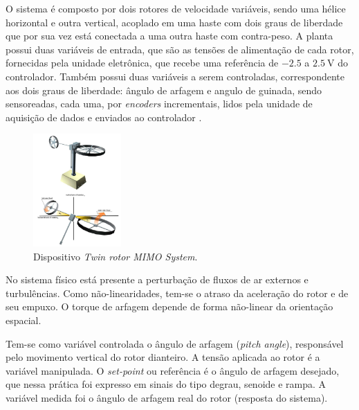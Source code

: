 O sistema é composto por dois rotores de velocidade variáveis, sendo uma hélice horizontal e outra vertical, acoplado em uma haste com dois graus de liberdade que por sua vez está conectada a uma outra haste com contra-peso.
A planta possui duas variáveis de entrada, que são as tensões de alimentação de cada rotor, fornecidas pela unidade eletrônica, que recebe uma referência de $-2.5$ a $\SI{2.5}{\volt}$ do controlador. Também possui duas variáveis a serem controladas, correspondente aos dois graus de liberdade: ângulo de arfagem e angulo de guinada, sendo sensoreadas, cada uma, por \textit{encoders} incrementais, lidos pela unidade de aquisição de dados e enviados ao controlador \cite{ManualRotor}.

\begin{figure}[H]
    \centering
    \includegraphics[width=0.30\textwidth]{figures/twin_rotor.PNG}
    \caption{Dispositivo \textit{Twin rotor MIMO System}.}
    \label{fig:TwinRotor}
\end{figure}

No sistema físico está presente a perturbação de fluxos de ar externos e turbulências. Como não-linearidades, tem-se o atraso da aceleração do rotor e de seu empuxo. O torque de arfagem depende de forma não-linear da orientação espacial.

Tem-se como variável controlada o ângulo de arfagem (\textit{pitch angle}), responsável pelo movimento vertical do rotor dianteiro. A tensão aplicada ao rotor é a variável manipulada. O \textit{set-point} ou referência é o ângulo de arfagem desejado, que nessa prática foi expresso em sinais do tipo degrau, senoide e rampa. A variável medida foi o ângulo de arfagem real do rotor (resposta do sistema).

